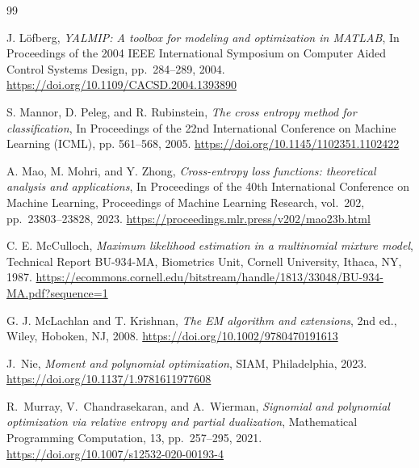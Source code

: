 \documentclass[pdflatex,sn-mathphys-num]{sn-jnl}%
\theoremstyle{thmstyleone}%
\theoremstyle{thmstyletwo}%
\theoremstyle{thmstylethree}%
\begin{document}
\begin{thebibliography}{99}

{\sc J. Löfberg}, {\em YALMIP: A toolbox for modeling and optimization in MATLAB}, In Proceedings of the 2004 IEEE International Symposium on Computer Aided Control Systems Design, pp.~284--289, 2004.
\url{https://doi.org/10.1109/CACSD.2004.1393890}

{\sc S. Mannor, D. Peleg, and R. Rubinstein},
{\em The cross entropy method for classification},
In Proceedings of the 22nd International Conference on Machine Learning (ICML), pp. 561--568, 2005.
\url{https://doi.org/10.1145/1102351.1102422}

{\sc A. Mao, M. Mohri, and Y. Zhong},
{\em Cross-entropy loss functions: theoretical analysis and applications}, In Proceedings of the 40th International Conference on Machine Learning, Proceedings of Machine Learning Research, vol.~202, pp.~23803--23828, 2023.
\url{https://proceedings.mlr.press/v202/mao23b.html}


{\sc C. E. McCulloch}, {\em Maximum likelihood estimation in a multinomial mixture model}, Technical Report BU-934-MA, Biometrics Unit, Cornell University, Ithaca, NY, 1987.
\url{https://ecommons.cornell.edu/bitstream/handle/1813/33048/BU-934-MA.pdf?sequence=1}


{\sc G. J. McLachlan and T. Krishnan},
{\em The EM algorithm and extensions}, 2nd ed.,
Wiley, Hoboken, NJ, 2008.
\url{https://doi.org/10.1002/9780470191613}




{\sc J.~Nie},
{\em Moment and polynomial optimization},
SIAM, Philadelphia, 2023.
\url{https://doi.org/10.1137/1.9781611977608}


{\sc R.~Murray, V.~Chandrasekaran, and A.~Wierman},
{\em Signomial and polynomial optimization via relative entropy
and partial dualization},
Mathematical Programming Computation, 13,
pp.~257--295, 2021.
\url{https://doi.org/10.1007/s12532-020-00193-4}



\end{thebibliography}
\end{document}
